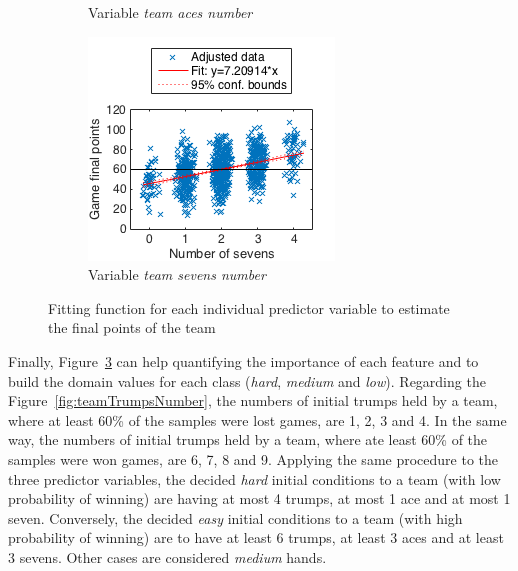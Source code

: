 \begin{figure}[h]
\begin{subfigure}[h]{0.32\textwidth}
                \caption{Variable \emph{team aces number}}
                \label{fig:teamAcesNumber}
        \end{subfigure}
        \begin{subfigure}[h]{0.32\textwidth}
                \includegraphics[width=\textwidth]{./img/4/teamSevensNumber}
                \caption{Variable \emph{team sevens number}}
                \label{fig:teamSevensNumber}
        \end{subfigure}
        \caption{Fitting function for each individual predictor variable to estimate the final points of the team}
        \label{fig:fitFunctions}
\end{figure}

Finally, Figure~\ref{fig:fitFunctions} can help quantifying the importance of each feature and to build the domain values for each class (\emph{hard}, \emph{medium} and \emph{low}).
Regarding the Figure~\ref{fig:teamTrumpsNumber}, the numbers of initial trumps held by a team, where at least 60\% of the samples were lost games, are 1, 2, 3 and 4.
In the same way, the numbers of initial trumps held by a team, where ate least 60\% of the samples were won games, are 6, 7, 8 and 9.
Applying the same procedure to the three predictor variables, the decided \emph{hard} initial conditions to a team (with low probability of winning) are having at most 4 trumps, at most 1 ace and at most 1 seven.
Conversely, the decided \emph{easy} initial conditions to a team (with high probability of winning) are to have at least 6 trumps, at least 3 aces and at least 3 sevens.
Other cases are considered \emph{medium} hands.

